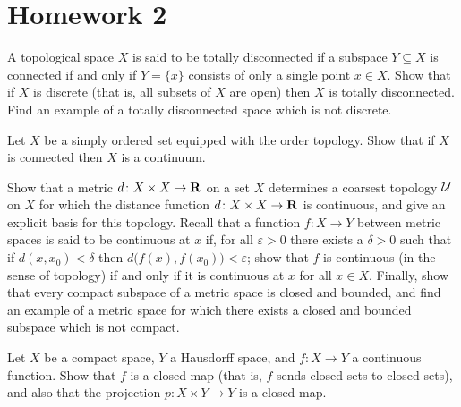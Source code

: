 \section{Homework 2}
\begin{exercise}
  A topological space \(X\) is said to be totally disconnected if a
  subspace \(Y\subseteq X\) is connected if and only if \(Y=\{x\}\)
  consists of only a single point \(x\in X\). Show that if \(X\) is
  discrete (that is, all subsets of \(X\) are open) then \(X\) is totally
  disconnected. Find an example of a totally disconnected space which is
  not discrete.
\end{exercise}
\begin{solution}
\end{solution}

\begin{exercise}
  Let \(X\) be a simply ordered set equipped with the order topology. Show
  that if \(X\) is connected then \(X\) is a continuum.
\end{exercise}
\begin{solution}
\end{solution}

\begin{exercise}
  Show that a metric \(d\colon X\times X\to\mathbf{R}\) on a set \(X\) determines
  a coarsest topology \(\mathcal{U}\) on \(X\) for which the distance function
  \(d\colon X\times X\to\mathbf{R}\) is continuous, and give an explicit basis
  for this topology. Recall that a function \(f\colon X\to Y\) between
  metric spaces is said to be continuous at \(x\) if, for all
  \(\varepsilon>0\) there exists a \(\delta>0\) such that if
  \(d(x,x_0)<\delta\) then \(d\bigl(f(x),f(x_0)\bigr)<\varepsilon\); show
  that \(f\) is continuous (in the sense of topology) if and only if it is
  continuous at \(x\) for all \(x\in X\). Finally, show that every compact
  subspace of a metric space is closed and bounded, and find an example of
  a metric space for which there exists a closed and bounded subspace which
  is not compact.
\end{exercise}
\begin{solution}
\end{solution}

\begin{exercise}
  Let \(X\) be a compact space, \(Y\) a Hausdorff space, and
  \(f\colon X\to Y\) a continuous function. Show that \(f\) is a closed map
  (that is, \(f\) sends closed sets to closed sets), and also that the
  projection \(p\colon X\times Y\to Y\) is a closed map.
\end{exercise}
\begin{solution}
\end{solution}

